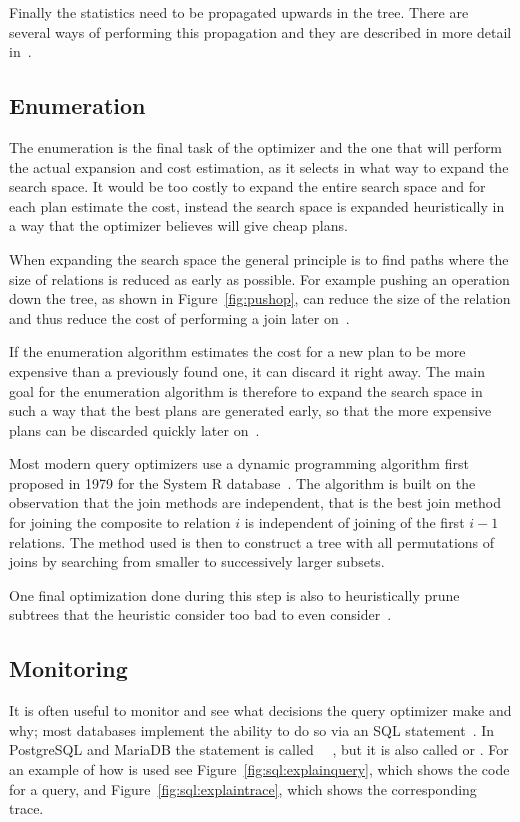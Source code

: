 Finally the statistics need to be propagated upwards in the tree. There are
several ways of performing this propagation and they are described in more
detail in~\cite{chaudhuri_1998_overview_aooqoirs}.

\subsection{Enumeration}
The enumeration is the final task of the optimizer and the one that will perform
the actual expansion and cost estimation, as it selects in what way to expand
the search space. It would be too costly to expand the entire search space and
for each plan estimate the cost, instead the search space is expanded
heuristically in a way that the optimizer believes will give cheap plans.

When expanding the search space the general principle is to find paths where the
size of relations is reduced as early as possible. For example pushing an
operation down the tree, as shown in Figure~\ref{fig:pushop}, can reduce the
size of the relation and thus reduce the cost of performing a join later
on~\cite[p. 772-774]{garcia-molina_2002_database_dstcb}.

If the enumeration algorithm estimates the cost for a new plan to be more
expensive than a previously found one, it can discard it right away. The main
goal for the enumeration algorithm is therefore to expand the search space in
such a way that the best plans are generated early, so that the more expensive
plans can be discarded quickly later on~\cite{nica_2012_analyzing_aqoppojea}.

Most modern query optimizers use a dynamic programming algorithm first proposed
in 1979 for the System R database~\cite{selinger_1979_access_apsiardms}. The
algorithm is built on the observation that the join methods are independent,
that is the best join method for joining the composite to relation $i$ is
independent of joining of the first $i-1$ relations. The method used is then to
construct a tree with all permutations of joins by searching from smaller to
successively larger subsets.

One final optimization done during this step is also to heuristically prune
subtrees that the heuristic consider too bad to even
consider~\cite{ono_1990_measuring_mtcojeiqo}.

\subsection{Monitoring}
It is often useful to monitor and see what decisions the query optimizer make
and why; most databases implement the ability to do so via an SQL
statement~\cite[p. 34]{lahdenmaki_2005_relational_rdidatodossea}. In PostgreSQL
and MariaDB the statement is called
~\cite{postgresql_pd9e}~\cite{explain_emkb}, but it is also called
 or . For an example of how  is
used see Figure~\ref{fig:sql:explainquery}, which shows the code for a query,
and Figure~\ref{fig:sql:explaintrace}, which shows the corresponding trace.

